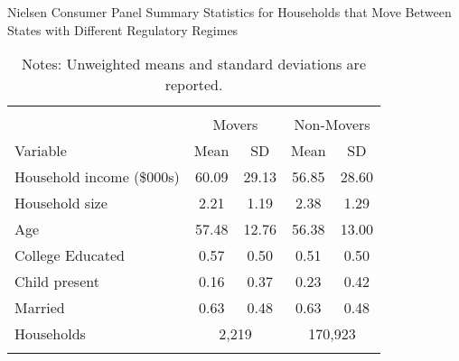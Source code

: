 \begin{table}[!htbp] \centering
\caption{Nielsen Consumer Panel Summary Statistics for Households that Move Between States with Different Regulatory Regimes}
\label{tab:summaryStatsUnitLawsMovers}
\begin{tabular}{lcccc}
\\[-1.8ex]\hline
\hline \\[-1.8ex]
                      & \multicolumn{2}{c}{Movers}  & \multicolumn{2}{c}{Non-Movers} \\
Variable                  & Mean  & SD              & Mean   & SD  \\
\hline
Household income (\$000s) & 60.09 & 29.13           & 56.85   & 28.60 \\
Household size            & 2.21  & 1.19            & 2.38    & 1.29 \\
Age                       & 57.48 & 12.76           & 56.38   & 13.00\\
College Educated          & 0.57  & 0.50            & 0.51    & 0.50 \\
Child present             & 0.16  & 0.37            & 0.23    & 0.42 \\
Married                   & 0.63  & 0.48            & 0.63    & 0.48 \\
Households                & \multicolumn{2}{c}{2,219} & \multicolumn{2}{c}{170,923}
\\[-1.8ex]\hline
\hline \\[-1.8ex]
\end{tabular}
\caption*{Notes: Unweighted means and standard deviations are reported.}
\end{table}
